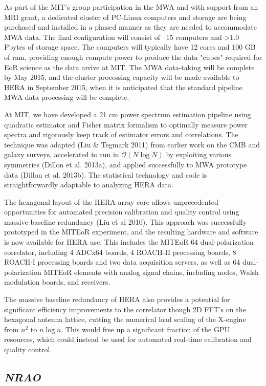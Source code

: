 \documentclass[11pt]{article}
\begin{document}
As part of the MIT's group participation in the MWA and with support from an
MRI grant, a dedicated cluster of PC-Linux computers and storage are being
purchased and installed in a phased manner as they are needed to accommodate
MWA data. The final configuration will consist of ~15 computers and >1.0 Pbytes
of storage space. The computers will typically have 12 cores and 100 GB of ram,
providing enough compute power to produce the data "cubes" required for EoR
science as the data arrive at MIT. The MWA data-taking will be complete by May
2015, and the cluster processing capacity will be made available to HERA in
September 2015, when it is anticipated that the standard pipeline MWA data
processing will be complete.

At MIT, we have developed a 21 cm power spectrum estimation pipeline using
quadratic estimator and Fisher matrix formalism to optimally measure power
spectra and rigorously keep track of estimator errors and correlations.  The
technique was adapted (Liu \& Tegmark 2011) from earlier work on the CMB and
galaxy surveys, accelerated to run in $\mathcal{O}(N\log N)$ by exploiting
various symmetries (Dillon et al. 2013a), and applied successfully to MWA
prototype data (Dillon et al. 2013b). The statistical technology and code is
straightforwardly adaptable to analyzing HERA data.

The hexagonal layout of the HERA array core allows unprecedented opportunities
for automated precision calibration and quality control using massive baseline
redundancy (Liu et al 2010). This approach was successfully prototyped in the
MITEoR experiment, and the resulting hardware and software is now available for
HERA use. This includes the MITEoR 64 dual-polarization correlator, including 4
ADCx64 boards, 4 ROACH-II processing boards, 8 ROACH-I processing boards and
two data acquisition servers, as well as 64 dual-polarization MITEoR elements
with analog signal chains, including nodes, Walsh modulation boards, and
receivers.

The massive baseline redundancy of HERA also provides a potential for
significant efficiency improvements to the correlator though 2D FFT's on the
hexagonal antenna lattice, cutting the numerical load scaling of the X-engine
from $n^2$ to $n \log n$. This would free up a significant fraction of the GPU
resources, which could instead be used for automated real-time calibration and
quality control.


\subsection*{\it NRAO} 
\end{document}
